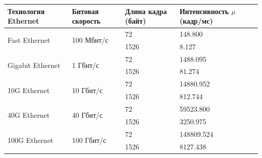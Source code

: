 \documentclass[aspectratio=169]{beamer}
\begin{document}
\begin{frame}

\begin{tabular}{|p{}|p{}|p{}|p{}|}
	\hline Технология Ethernet & Битовая скорость & Длина кадра (байт) & Интенсивность \( \mu \) (кадр/мс) \\
	\hline \multirow{2}{*}{Fast Ethernet} 	& \multirow{2}{*}{100 Мбит/с} 	& 72 	& 148.800 \\
	\hhline{~~--}				  			& \multirow{2}{*}{}           	& 1526 	& 8.127 \\ 
	
	\hline \multirow{2}{*}{Gigabit Ethernet} 	& \multirow{2}{*}{1 Гбит/с} 		& 72 	& 1488.095 \\
	\hhline{~~--}				  			& \multirow{2}{*}{}           	& 1526 	& 81.274 \\ 
	
	\hline \multirow{2}{*}{10G Ethernet} 		& \multirow{2}{*}{10 Гбит/с} 	& 72 	& 14880.952 \\
	\hhline{~~--}				  			& \multirow{2}{*}{}           	& 1526 	& 812.744 \\ 
	
	\hline \multirow{2}{*}{40G Ethernet} 		& \multirow{2}{*}{40 Гбит/с} 	& 72 	& 59523.800 \\
	\hhline{~~--}				  			& \multirow{2}{*}{}           	& 1526 	& 3250.975 \\ 
	
	\hline \multirow{2}{*}{100G Ethernet} 	& \multirow{2}{*}{100 Гбит/с} 	& 72 	& 148809.524 \\
	\hhline{~~--}				  			& \multirow{2}{*}{}           	& 1526 	& 8127.438 \\
	\hline
\end{tabular}
\end{frame}
\end{document}
